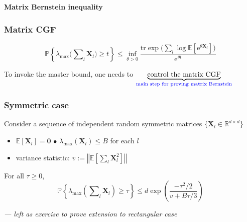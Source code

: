 \documentclass[compress,
mathserif,wide,%
]{beamer}
\begin{document}
\begin{frame}[plain]

\vfill
\begin{center}
  {\Large\bf Matrix Bernstein inequality}
\end{center}

\vfill

\end{frame}


\begin{frame}
\frametitle{Matrix CGF}  

\[
	\mathbb{P}\left\{ \lambda_{\max}\big(\sum\nolimits _{l}\bm{X}_{l}\big)\geq t\right\} \leq\inf_{\theta>0}\frac{\mathrm{tr}\exp\big(\sum\nolimits _{l}\log\mathbb{E}[\mathrm{e}^{\theta\bm{X}_{l}}]\big)}{\mathrm{e}^{\theta t}}
\]


\bigskip
\bigskip

To invoke the master bound, one needs to \hspace{-1.5em} $\underset{\textcolor{blue}{ \text{main step for proving matrix Bernstein}}}{\underbrace{\text{control the matrix CGF}}}$ 
	



\end{frame}






\begin{frame}
\frametitle{Symmetric case}  


Consider a sequence of independent random symmetric matrices $\big\{ \bm{X}_{l}\in\mathbb{R}^{d \times d}\big\} $
%
\begin{itemize}
	\itemsep0.5em
	\item $\mathbb{E}[\bm{X}_l]=\bm{0}$ \qquad\qquad\qquad\qquad\qquad $\bullet$ $\lambda_{\max}(\bm{X}_{l}) \leq B$ for each $l$
	\item variance statistic: 
	$v:= \left\Vert  \mathbb{E}\left[ \sum\nolimits_{l} \bm{X}_{l}^2  \right]  \right\Vert  $
\end{itemize}

\begin{theorem}
\label{thm:mtx-Bernstein-symmetric}
%
For all $\tau \geq 0$,
\vspace{-1em}
\[
	\mathbb{P}\left\{ \lambda_{\max}\left( \sum\nolimits_{l}\bm{X}_{l}\right ) \geq \tau\right\} \leq d \exp\left(\frac{-\tau^{2}/2}{v+B\tau/3}\right)
\]
%
\end{theorem}

{\hfill \em \footnotesize--- left as exercise to prove extension to rectangular case}
\end{frame}
\end{document}
